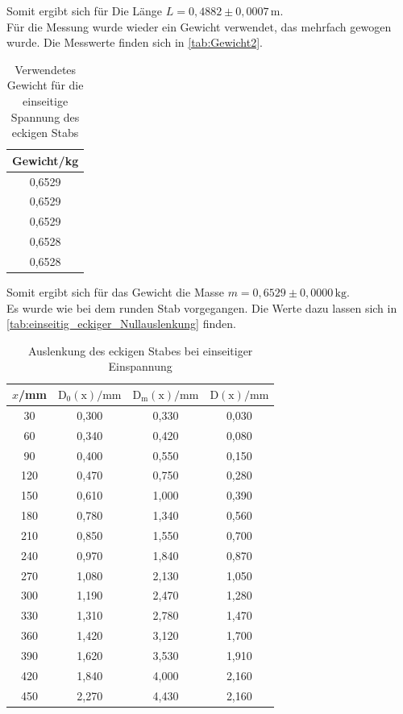  Somit ergibt sich für Die Länge $L = 0{,}4882 \pm 0,0007 \, \mathrm{m}$.\\

  Für die Messung wurde wieder ein Gewicht verwendet, das mehrfach gewogen wurde. Die Messwerte finden sich in \autoref{tab:Gewicht2}.

  \begin{table}
    \centering
    \caption{Verwendetes Gewicht für die einseitige Spannung des eckigen Stabs}
    \label{tab:Gewicht2}
    \begin{tabular}{c}
      \toprule
      Gewicht/kg \\
      \midrule
      0,6529 \\
      0,6529 \\
      0,6529 \\
      0,6528 \\
      0,6528 \\
      \bottomrule
    \end{tabular}
  \end{table}

  Somit ergibt sich für das Gewicht die Masse $m = 0{,}6529 \pm 0,0000 \, \mathrm{kg}$.\\

  Es wurde wie bei dem runden Stab vorgegangen. Die Werte dazu lassen
  sich in \autoref{tab:einseitig_eckiger_Nullauslenkung} finden.

  \begin{table}
    \centering
    \caption{Auslenkung des eckigen Stabes bei einseitiger Einspannung}
    \label{tab:einseitig_eckiger_Nullauslenkung}
    \begin{tabular}{c c c c}
      \toprule
      $x$/mm & $\mathrm{D_0(x)}/\mathrm{mm}$ & $\mathrm{D_m(x)}/\mathrm{mm}$ & $\mathrm{D(x)}/\mathrm{mm}$ \\
      \midrule
      30 & 0,300 & 0,330 & 0,030 \\
      60 & 0,340 & 0,420 & 0,080 \\
      90 & 0,400 & 0,550 & 0,150 \\
      120 & 0,470 & 0,750 & 0,280 \\
      150 & 0,610 & 1,000 & 0,390 \\
      180 & 0,780 & 1,340 & 0,560 \\
      210 & 0,850 & 1,550 & 0,700 \\
      240 & 0,970 & 1,840 & 0,870 \\
      270 & 1,080 & 2,130 & 1,050 \\
      300 & 1,190 & 2,470 & 1,280 \\
      330 & 1,310 & 2,780 & 1,470 \\
      360 & 1,420 & 3,120 & 1,700 \\
      390 & 1,620 & 3,530 & 1,910 \\
      420 & 1,840 & 4,000 & 2,160 \\
      450 & 2,270 & 4,430 & 2,160 \\
      \bottomrule
    \end{tabular}
  \end{table}

